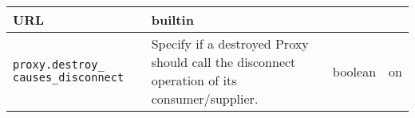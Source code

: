 \begin{small}
\begin{longtable}{|p{5cm}|p{7.5cm}|p{1.5cm}|p{1.5cm}|}
    URL & builtin \\ \hline

    \verb"proxy.destroy_"
    \verb"causes_disconnect" &

    Specify if a destroyed Proxy should call the disconnect operation
    of its consumer/supplier. &

    boolean & on \\ \hline

 

  \end{longtable}
\end{small}



